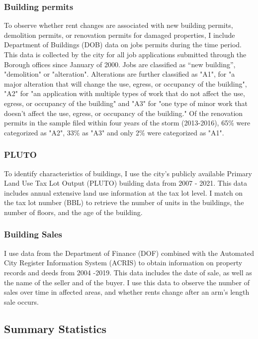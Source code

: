 \documentclass[12pt]{article}
\begin{document}
{{{{\subsubsection*{Building permits}
To observe whether rent changes are associated with new building permits, demolition permits, or renovation permits for damaged properties, I include Department of Buildings (DOB) data on jobs permits during the time period. This data is collected by the city for all job applications submitted through the Borough offices since January of 2000.  Jobs are classified as “new building”, "demolition" or "alteration". Alterations are further classified as "A1", for "a major alteration that will change the use, egress, or occupancy of the building", "A2" for "an application with multiple types of work that do not affect the use, egress, or occupancy of the building" and "A3" for "one type of minor work that doesn't affect the use, egress, or occupancy of the building."  Of the renovation permits in the sample filed within four years of the storm (2013-2016), 65\% were categorized as "A2", 33\% as "A3" and only 2\% were categorized as "A1".

\subsubsection*{PLUTO} 
To identify characteristics of buildings, I use the city's publicly available Primary Land Use Tax Lot Output (PLUTO) building data from 2007 - 2021.  This data includes annual extensive land use information at the tax lot level.  I match on the tax lot number (BBL) to retrieve the number of units in the buildings, the number of floors, and the age of the building. 

\subsubsection*{Building Sales}
I use data from the Department of Finance (DOF) combined with the Automated City Register Information System (ACRIS) to obtain information on property records and deeds from 2004 -2019.  This data includes the date of sale, as well as the name of the seller and of the buyer.  I use this data to observe the number of sales over time in affected areas, and whether rents change after an arm's length sale occurs. 

\subsection{Summary Statistics}

}}}}
\end{document}
